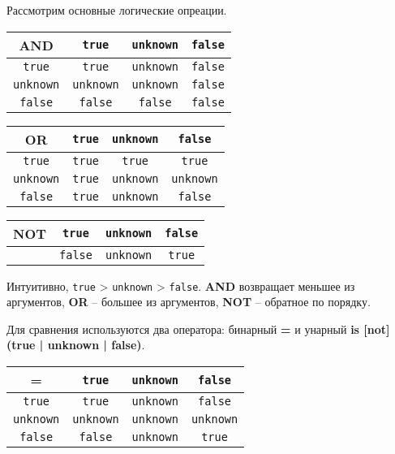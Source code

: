 Рассмотрим основные логические опреации.

\begin{center}
	\begin{tabular}{|c||c|c|c|}
		\hline
		\textbf{AND}     & \texttt{true}    & \texttt{unknown} & \texttt{false} \\
		\hline
		\hline
		\texttt{true}    & \texttt{true}    & \texttt{unknown} & \texttt{false} \\
		\hline
		\texttt{unknown} & \texttt{unknown} & \texttt{unknown} & \texttt{false} \\
		\hline
		\texttt{false}   & \texttt{false}   & \texttt{false}   & \texttt{false} \\
		\hline
	\end{tabular}
\end{center}

\begin{center}
	\begin{tabular}{|c||c|c|c|}
		\hline
		\textbf{OR}      & \texttt{true} & \texttt{unknown} & \texttt{false}   \\
		\hline
		\hline
		\texttt{true}    & \texttt{true} & \texttt{true}    & \texttt{true}    \\
		\hline
		\texttt{unknown} & \texttt{true} & \texttt{unknown} & \texttt{unknown} \\
		\hline
		\texttt{false}   & \texttt{true} & \texttt{unknown} & \texttt{false}   \\
		\hline
	\end{tabular}
\end{center}

\begin{center}
	\begin{tabular}{|c||c|c|c|}
		\hline
		\textbf{NOT} & \texttt{true}  & \texttt{unknown} & \texttt{false} \\
		\hline
		\hline
		             & \texttt{false} & \texttt{unknown} & \texttt{true}  \\
		\hline
	\end{tabular}
\end{center}

Интуитивно, \texttt{true} > \texttt{unknown} > \texttt{false}.
\textbf{AND} возвращает меньшее из аргументов, \textbf{OR} -- большее из
аргументов, \textbf{NOT} -- обратное по порядку.

Для сравнения используются два оператора: бинарный \textbf{=} и унарный
\textbf{is [not] (true | unknown | false)}.

\begin{center}
	\begin{tabular}{|c||c|c|c|}
		\hline
		\textbf{=}       & \texttt{true}    & \texttt{unknown} & \texttt{false}   \\
		\hline
		\hline
		\texttt{true}    & \texttt{true}    & \texttt{unknown} & \texttt{false}   \\
		\hline
		\texttt{unknown} & \texttt{unknown} & \texttt{unknown} & \texttt{unknown} \\
		\hline
		\texttt{false}   & \texttt{false}   & \texttt{unknown} & \texttt{true}    \\
		\hline
	\end{tabular}
\end{center}

